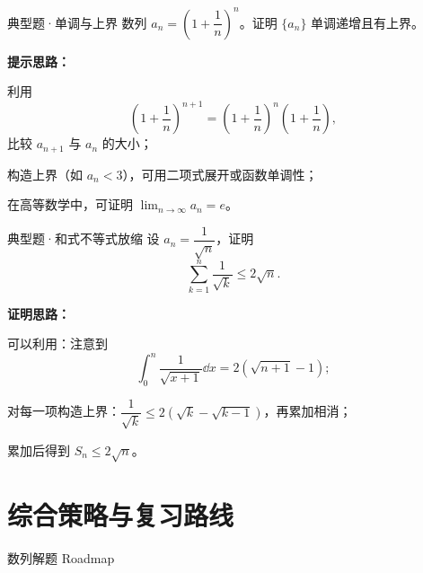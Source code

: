 \documentclass[a4paper,11pt]{ctexart}
\begin{document}
\begin{examplebox}{典型题·单调与上界}
  数列 $a_n=\left(1+\dfrac{1}{n}\right)^n$。证明 $\{a_n\}$ 单调递增且有上界。

  \textbf{提示思路：}
  \begin{focuspoints}
    \item 利用
    \[
      \left(1+\frac{1}{n}\right)^{n+1}=\left(1+\frac{1}{n}\right)^n\left(1+\frac{1}{n}\right),
    \]
    比较 $a_{n+1}$ 与 $a_n$ 的大小；
    \item 构造上界（如 $a_n<3$），可用二项式展开或函数单调性；
    \item 在高等数学中，可证明 $\lim_{n\to\infty}a_n=e$。
  \end{focuspoints}
\end{examplebox}

\begin{examplebox}{典型题·和式不等式放缩}
  设 $a_n=\dfrac{1}{\sqrt{n}}$，证明
  \[
    \sum_{k=1}^{n}\frac{1}{\sqrt{k}}\le 2\sqrt{n}.
  \]

  \textbf{证明思路：}
  \begin{focuspoints}
    \item 可以利用：注意到
    \[
      \int_{0}^{n}\frac{1}{\sqrt{x+1}}\dd x=2(\sqrt{n+1}-1);
    \]
    \item 对每一项构造上界：$\dfrac{1}{\sqrt{k}}\le2(\sqrt{k}-\sqrt{k-1})$，再累加相消；
    \item 累加后得到 $S_n\le2\sqrt{n}$。
  \end{focuspoints}
\end{examplebox}

\clearpage
\section{综合策略与复习路线}

\begin{NoteRoadmap}{数列解题 Roadmap}
\end{NoteRoadmap}
\end{document}

